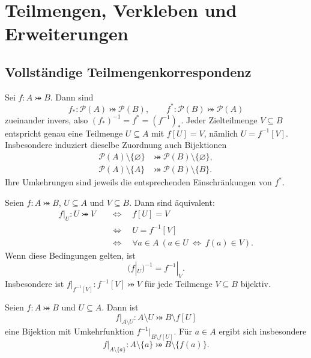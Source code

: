 \chapter{Teilmengen, Verkleben und Erweiterungen}
\label{b08guide:ch:restrictions}

\section{Vollständige Teilmengenkorrespondenz}

\begin{theorem}
\label{b08guide:thm:subsetcorrespondence}
Sei $f\colon A\bij B$. Dann sind
\[
 f_*\colon\mathcal P(A)\bij\mathcal P(B),
 \qquad f^*\colon\mathcal P(B)\bij\mathcal P(A)
\]
zueinander invers, also $(f_*)^{-1}=f^*=(f^{-1})_*$.
Jeder Zielteilmenge $V\subseteq B$ entspricht genau eine
Teilmenge $U\subseteq A$ mit $f[U]=V$, nämlich $U=f^{-1}[V]$.
Insbesondere induziert dieselbe Zuordnung auch Bijektionen
\[
 \begin{aligned}
 \mathcal P(A)\setminus\{\varnothing\}
   &\bij\mathcal P(B)\setminus\{\varnothing\},\\
 \mathcal P(A)\setminus\{A\}
   &\bij\mathcal P(B)\setminus\{B\}.
 \end{aligned}
\]
Ihre Umkehrungen sind jeweils die entsprechenden Einschränkungen von $f^*$.
\end{theorem}

\begin{theorem}
\label{b08guide:thm:restriction}
Seien $f\colon A\bij B$, $U\subseteq A$ und $V\subseteq B$.
Dann sind äquivalent:
\[
 \begin{aligned}
 f|_U\colon U\bij V
 &\quad\Longleftrightarrow\quad f[U]=V\\
 &\quad\Longleftrightarrow\quad U=f^{-1}[V]\\
 &\quad\Longleftrightarrow\quad
   \forall a\in A\ (a\in U\ \Longleftrightarrow\ f(a)\in V).
 \end{aligned}
\]
Wenn diese Bedingungen gelten, ist
\[
 (f|_U)^{-1}=f^{-1}|_V.
\]
Insbesondere ist $f|_{f^{-1}[V]}\colon f^{-1}[V]\bij V$
für jede Teilmenge $V\subseteq B$ bijektiv.
\end{theorem}

\begin{theorem}
\label{b08guide:thm:complementrestriction}
Seien $f\colon A\bij B$ und $U\subseteq A$. Dann ist
\[
 f|_{A\setminus U}\colon A\setminus U\bij B\setminus f[U]
\]
eine Bijektion mit Umkehrfunktion
$f^{-1}|_{B\setminus f[U]}$.
Für $a\in A$ ergibt sich insbesondere
\[
 f|_{A\setminus\{a\}}\colon
 A\setminus\{a\}\bij B\setminus\{f(a)\}.
\]
\end{theorem}

